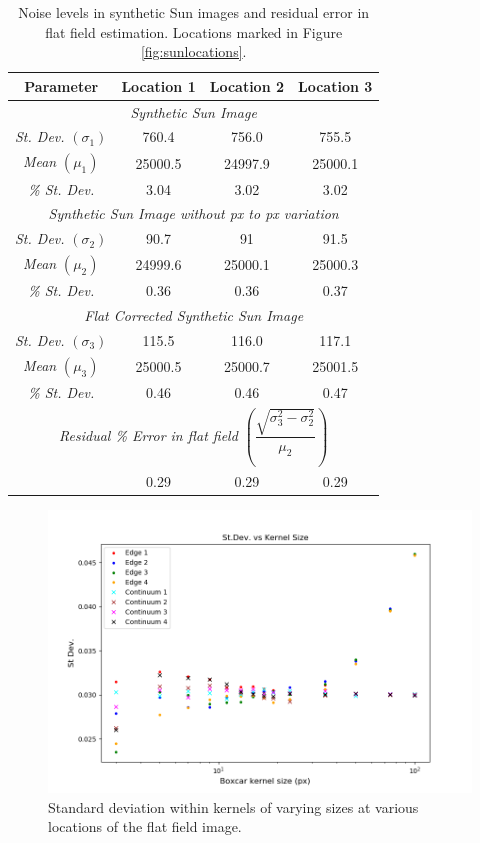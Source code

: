 \documentclass[11pt,a4paper]{article}
\begin{document}
	\begin{table}
		\centering
		\begin{tabular}{|c|c|c|c|}
			\hline
			\textbf{Parameter} &\textbf{ Location 1 }&\textbf{ Location 2} & \textbf{Location 3} \\ 
			\hline
			\hline 
			\multicolumn{4}{|c|}{\textit{Synthetic Sun Image }} \\ 
			\hline
			\hline 
			\textit{St. Dev.} $(\sigma_1)$ &760.4  & 756.0 & 755.5 \\ 
			\hline 
			\textit{Mean }$(\mu_1)$& 25000.5 & 24997.9 & 25000.1 \\ 
			\hline 
			\textit{\% St. Dev.} &3.04  & 3.02 & 3.02 \\ 
			\hline 
			\hline
			\multicolumn{4}{|c|}{\textit{Synthetic Sun Image without px to px variation}} \\ 
			\hline
			\hline 
			\textit{St. Dev.} $(\sigma_2)$& 90.7  & 91 & 91.5 \\ 
			\hline 
			\textit{Mean} $(\mu_2)$& 24999.6 & 25000.1 & 25000.3 \\ 
			\hline 
			\textit{\% St. Dev.}& 0.36 & 0.36 & 0.37 \\ 
			\hline 
			\hline
			\multicolumn{4}{|c|}{\textit{Flat Corrected Synthetic Sun Image}} \\ 
			\hline
			\hline 
			\textit{St. Dev. }$(\sigma_3)$& 115.5 & 116.0 & 117.1 \\ 
			\hline 
			\textit{Mean} $(\mu_3)$& 25000.5 & 25000.7 & 25001.5 \\ 
			\hline 
			\textit{\% St. Dev.}& 0.46 & 0.46 & 0.47 \\ 
			\hline 
			\hline
			\multicolumn{4}{|c|}{\textit{Residual \% Error in flat field} $\left(\dfrac{\sqrt{\sigma_3^2-\sigma_2^2}}{\mu_2}\right)$} \\
			\hline
			\hline
			& 0.29 & 0.29 & 0.29 \\ 
			\hline
		\end{tabular} 
		\caption{Noise levels in synthetic Sun images and residual error in flat field estimation. Locations marked in Figure \ref{fig:sunlocations}. }
		\label{table:suncompare}
	\end{table}
	
	
	\begin{figure}
		\centering
		\includegraphics[width=0.8\linewidth]{pics/synth_Stdev.png}
		\caption{Standard deviation within kernels of varying sizes at various locations of the flat field image.}
		\label{fig:synth_st}
	\end{figure}
	
\end{document}
